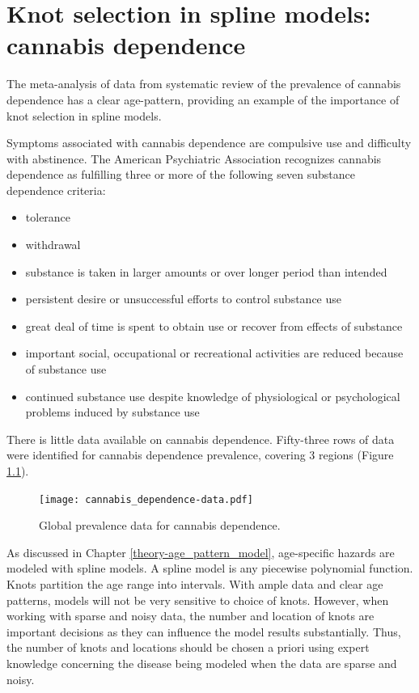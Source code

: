 \chapter{Knot selection in spline models: cannabis dependence}
\label{applications-splines_knot_loc}

The meta-analysis of data from systematic review of the prevalence of cannabis dependence has a clear age-pattern, providing an example of the importance of knot selection in spline models.

Symptoms associated with cannabis dependence are compulsive use and difficulty with abstinence.  The American Psychiatric Association recognizes cannabis dependence as fulfilling three or more of the following seven substance dependence criteria:
    \begin{itemize} \label{page:app-substance_dependence}
        \item tolerance
        \item withdrawal
        \item substance is taken in larger amounts or over longer period than intended
        \item persistent desire or unsuccessful efforts to control substance use
        \item great deal of time is spent to obtain use or recover from effects of substance
        \item important social, occupational or recreational activities are reduced because of substance use
        \item continued substance use despite knowledge of physiological or psychological problems induced by substance use \cite{american_diagnostic_2000, coffey_cannabis_2002}
    \end{itemize}

There is little data available on cannabis dependence.  Fifty-three rows of data were identified for cannabis dependence prevalence, covering 3 regions (Figure \ref{fig:app-cannabis_data}).

    \begin{figure}[h]
        \begin{center}
            \texttt{[image: cannabis\_dependence-data.pdf]}
            \caption{Global prevalence data for cannabis dependence.}
            \label{fig:app-cannabis_data}
        \end{center}
    \end{figure}

As discussed in Chapter \ref{theory-age_pattern_model}, age-specific hazards are modeled with spline models.  A spline model is any piecewise polynomial function.  Knots partition the age range into intervals.  With ample data and clear age patterns, models will not be very sensitive to choice of knots.  However, when working with sparse and noisy data, the number and location of knots are important decisions as they can influence the model results substantially.  Thus, the number of knots and locations should be chosen a priori using expert knowledge concerning the disease being modeled when the data are sparse and noisy.

